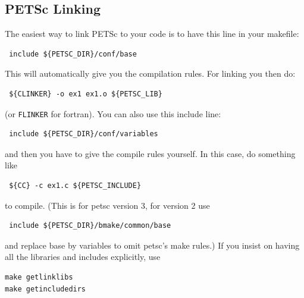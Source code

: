 \documentclass{article}
\begin{document}
\subsection{PETSc Linking}
The easiest way to link PETSc to your code is to have this line in your makefile:
\scriptsize
\begin{verbatim}
 include ${PETSC_DIR}/conf/base
\end{verbatim}
\normalsize
This will automatically give you the compilation rules. For linking you then do:
\scriptsize
\begin{verbatim}
 ${CLINKER} -o ex1 ex1.o ${PETSC_LIB}
\end{verbatim}
\normalsize
(or \verb+FLINKER+ for fortran). You can also use this include line:
\scriptsize
\begin{verbatim}
 include ${PETSC_DIR}/conf/variables
\end{verbatim}
\normalsize
and then you have to give the compile rules yourself. In this case, do something like
\scriptsize
\begin{verbatim}
 ${CC} -c ex1.c ${PETSC_INCLUDE}
\end{verbatim}
\normalsize
to compile. (This is for petsc version 3, for version 2 use
\scriptsize
\begin{verbatim}
 include ${PETSC_DIR}/bmake/common/base
\end{verbatim}
\normalsize
and replace base by variables to omit petsc’s make rules.) If you insist on having all the libraries and includes explicitly, use
\scriptsize
\begin{verbatim}
make getlinklibs
make getincludedirs
\end{verbatim}
\normalsize
\end{document}
